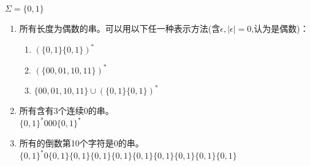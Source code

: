 \begin{solution} $\Sigma=\{0,1\}$
	\begin{enumerate}
		\item 所有长度为偶数的串。可以用以下任一种表示方法(含$\epsilon,|\epsilon|=0$,认为是偶数)：
		\begin{enumerate}
			\item $(\{0,1\}\{0,1\})^\ast$
			\item $(\{00,01,10,11\})^\ast$
			\item $\{00,01,10,11\}\cup (\{0,1\}\{0,1\})^\ast$
		\end{enumerate}
		\item 所有含有3个连续0的串。\\
		$\{0,1\}^\ast 000\{0,1\}^\ast$
		\item 所有的倒数第10个字符是0的串。\\
		$\{0,1\}^\ast0\{0,1\}\{0,1\}\{0,1\}\{0,1\}\{0,1\}\{0,1\}\{0,1\}\{0,1\}\{0,1\}$
	\end{enumerate}
\end{solution}
